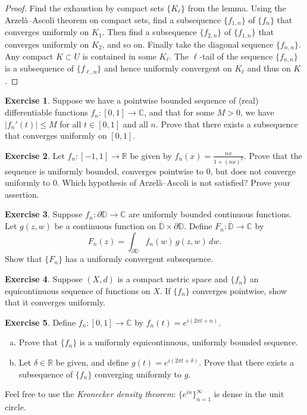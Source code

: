 \documentclass[12pt,openany]{book}
\newcommand{\sabs}[1]{\lvert {#1} \rvert}
\newcommand{\C}{{\mathbb{C}}}
\newcommand{\R}{{\mathbb{R}}}
\newcommand{\D}{{\mathbb{D}}}
\newcommand{\myindex}[1]{#1\index{#1}}
\theoremstyle{plain}
\theoremstyle{remark}
\theoremstyle{definition}
\newenvironment{exbox}{%
    \def\FrameCommand{\vrule width 1pt \relax\hspace{10pt}}%
    \MakeFramed{\advance\hsize-\width\FrameRestore}%
}{%
    \endMakeFramed
}
\newenvironment{exparts}{%
    \leavevmode\begin{enumerate}[a),noitemsep,topsep=0pt,parsep=0pt,partopsep=0pt]
}{%
    \end{enumerate}
}
\theoremstyle{exercise}
\newtheorem{exercise}{Exercise}[section]
\theoremstyle{example}
\begin{document}
\begin{proof}
Find the exhaustion by compact sets $\{ K_\ell \}$ from the lemma.
Using the Arzel\`a--Ascoli theorem on compact sets,
find a subsequence $\{ f_{1,n} \}$  of $\{f_n\}$ that converges uniformly
on $K_1$.  Then find a subsequence
$\{ f_{2,n} \}$ of
$\{ f_{1,n} \}$ that converges uniformly on $K_2$, and so on.
Finally take the diagonal sequence $\{ f_{n,n} \}$.
Any compact $K \subset U$
is contained in some $K_\ell$.  The $\ell$-tail of the sequence $\{ f_{n,n}
\}$ is a subsequence of $\{ f_{\ell,n} \}$ and hence uniformly convergent on
$K_\ell$ and thus on $K$.
\end{proof}

\begin{exbox}
\begin{exercise}
Suppose we have a pointwise bounded sequence of 
(real) differentiable functions
$f_n \colon [0,1] \to \C$,
and that for some $M> 0$, we have
$\sabs{f_n'(t)} \leq M$ for all $t \in [0,1]$ and all $n$.  Prove that there
exists a subsequence that converges uniformly on $[0,1]$.
\end{exercise}

\begin{exercise}
Let $f_n \colon [-1,1] \to \R$ be given by $f_n(x) = \frac{nx}{1+{(nx)}^2}$.
Prove that the sequence is uniformly bounded, converges pointwise to $0$, but
does not converge uniformly to $0$.
Which hypothesis of Arzel\`a--Ascoli
is not satisfied?  Prove your assertion.
\end{exercise}

\begin{exercise}
Suppose 
$f_n \colon \partial \D \to \C$ are uniformly bounded continuous functions.
Let $g(z,w)$ be a continuous function on $\overline{\D} \times \partial \D$.
Define
$F_n \colon \overline{\D} \to \C$ by
\begin{equation*}
F_n(z)  = \int_{\partial \D} f_n(w)\, g(z,w) \, dw . 
\end{equation*}
Show that $\{ F_n \}$ has a uniformly convergent subsequence.
\end{exercise}

\begin{exercise}
Suppose $(X,d)$ is a compact metric space and $\{ f_n \}$ an equicontinuous
sequence of functions on $X$.  If $\{ f_n \}$ converges
pointwise, show that it converges uniformly.
\end{exercise}

\begin{exercise}
Define $f_n \colon [0,1] \to \C$ by $f_n(t) = e^{i(2\pi t + n)}$.
\begin{exparts}
\item
Prove that $\{ f_n \}$ is a uniformly equicontinuous,
uniformly bounded sequence.
\item
Let $\delta \in \R$ be given, and define $g(t) = e^{i(2\pi t + \delta)}$.
Prove that there exists 
a subsequence of $\{ f_n \}$ converging uniformly to $g$.
\end{exparts}
Feel free to use the \emph{\myindex{Kronecker density theorem}}:
$\{ e^{in} \}_{n=1}^\infty$ is dense in the unit circle.
\end{exercise}
\end{exbox}
\end{document}
